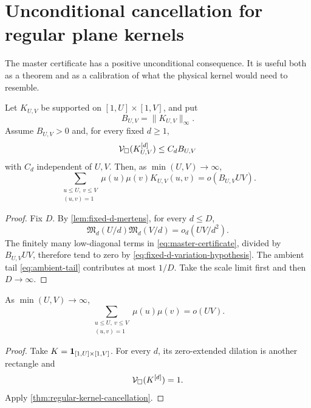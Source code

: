 \section{Unconditional cancellation for regular plane kernels}
\label{sec:smooth-kernels}

The master certificate has a positive unconditional consequence.  It is
useful both as a theorem and as a calibration of what the physical kernel
would need to resemble.

\begin{theorem}
\label{thm:regular-kernel-cancellation}
Let \(K_{U,V}\) be supported on
\([1,U]\times[1,V]\), and put
\[
 B_{U,V}=\|K_{U,V}\|_\infty.
\]
Assume \(B_{U,V}>0\) and, for every fixed \(d\ge1\),
\begin{equation}
 \mathcal V_\square(K_{U,V}^{[d]})
 \le C_d B_{U,V}
\label{eq:fixed-d-variation-hypothesis}
\end{equation}
with \(C_d\) independent of \(U,V\).  Then, as
\(\min(U,V)\to\infty\),
\begin{equation}
 \boxed{
 \sum_{\substack{u\le U,\ v\le V\\(u,v)=1}}
 \mu(u)\mu(v)K_{U,V}(u,v)
 =
 o(B_{U,V}UV).}
\label{eq:regular-kernel-cancellation}
\end{equation}
\end{theorem}

\begin{proof}
Fix \(D\).  By \cref{lem:fixed-d-mertens}, for every \(d\le D\),
\[
 \mathfrak M_d(U/d)\mathfrak M_d(V/d)
 =
 o_d(UV/d^2).
\]
The finitely many low-diagonal terms in
\eqref{eq:master-certificate}, divided by \(B_{U,V}UV\), therefore tend to
zero by \eqref{eq:fixed-d-variation-hypothesis}.  The ambient tail
\eqref{eq:ambient-tail} contributes at most \(1/D\).  Take the scale limit
first and then \(D\to\infty\).
\end{proof}

\begin{corollary}
\label{cor:primitive-rectangle}
As \(\min(U,V)\to\infty\),
\begin{equation}
 \sum_{\substack{u\le U,\ v\le V\\(u,v)=1}}
 \mu(u)\mu(v)=o(UV).
\label{eq:primitive-rectangle}
\end{equation}
\end{corollary}

\begin{proof}
Take \(K=\mathbf 1_{[1,U]\times[1,V]}\).  For every \(d\), its zero-extended
dilation is another rectangle and
\[
 \mathcal V_\square(K^{[d]})=1.
\]
Apply \cref{thm:regular-kernel-cancellation}.
\end{proof}

